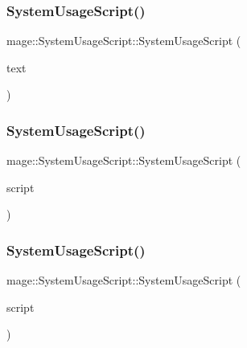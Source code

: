 \subsubsection{\texorpdfstring{System\+Usage\+Script()}{SystemUsageScript()}\hspace{0.1cm}{\footnotesize\ttfamily [1/3]}}
{\footnotesize\ttfamily mage\+::\+System\+Usage\+Script\+::\+System\+Usage\+Script (\begin{DoxyParamCaption}\item[{\hyperlink{classmage_1_1_sprite_text}{Sprite\+Text} $\ast$}]{text }\end{DoxyParamCaption})\hspace{0.3cm}{\ttfamily [explicit]}}

\hypertarget{classmage_1_1_system_usage_script_a3fccc6dda27ede785fb9c45360e53bb0}{}\label{classmage_1_1_system_usage_script_a3fccc6dda27ede785fb9c45360e53bb0} 
\subsubsection{\texorpdfstring{System\+Usage\+Script()}{SystemUsageScript()}\hspace{0.1cm}{\footnotesize\ttfamily [2/3]}}
{\footnotesize\ttfamily mage\+::\+System\+Usage\+Script\+::\+System\+Usage\+Script (\begin{DoxyParamCaption}\item[{const \hyperlink{classmage_1_1_system_usage_script}{System\+Usage\+Script} \&}]{script }\end{DoxyParamCaption})\hspace{0.3cm}{\ttfamily [delete]}}

\hypertarget{classmage_1_1_system_usage_script_a013e7c6510442421d74bffa3b2f810fe}{}\label{classmage_1_1_system_usage_script_a013e7c6510442421d74bffa3b2f810fe} 
\subsubsection{\texorpdfstring{System\+Usage\+Script()}{SystemUsageScript()}\hspace{0.1cm}{\footnotesize\ttfamily [3/3]}}
{\footnotesize\ttfamily mage\+::\+System\+Usage\+Script\+::\+System\+Usage\+Script (\begin{DoxyParamCaption}\item[{\hyperlink{classmage_1_1_system_usage_script}{System\+Usage\+Script} \&\&}]{script }\end{DoxyParamCaption})\hspace{0.3cm}{\ttfamily [default]}}

